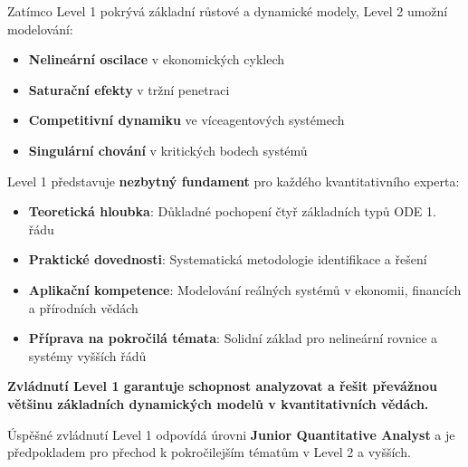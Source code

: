 \begin{transition}
\label{trans:rozsireni-aplikaci}
Zatímco Level 1 pokrývá základní růstové a dynamické modely, Level 2 umožní modelování:

\begin{itemize}
\item \textbf{Nelineární oscilace} v ekonomických cyklech
\item \textbf{Saturační efekty} v tržní penetraci
\item \textbf{Competitivní dynamiku} ve víceagentových systémech
\item \textbf{Singulární chování} v kritických bodech systémů
\end{itemize}
\end{transition}

\vspace{0.6\baselineskip}

\begin{conclusion}
\label{con:level1-kvantitativni-fundament}
Level 1 představuje \textbf{nezbytný fundament} pro každého kvantitativního experta:

\begin{itemize}
\item \textbf{Teoretická hloubka}: Důkladné pochopení čtyř základních typů ODE 1. řádu
\item \textbf{Praktické dovednosti}: Systematická metodologie identifikace a řešení
\item \textbf{Aplikační kompetence}: Modelování reálných systémů v ekonomii, financích a přírodních vědách
\item \textbf{Příprava na pokročilá témata}: Solidní základ pro nelineární rovnice a systémy vyšších řádů
\end{itemize}

\textbf{Zvládnutí Level 1 garantuje schopnost analyzovat a řešit převážnou většinu základních dynamických modelů v kvantitativních vědách.}
\end{conclusion}

\vspace{0.8\baselineskip}

\begin{remark}
\label{rem:certifikacni-uroven}
Úspěšné zvládnutí Level 1 odpovídá úrovni \textbf{Junior Quantitative Analyst} a je předpokladem pro přechod k pokročilejším tématům v Level 2 a vyšších.
\end{remark}

\vspace{0.8\baselineskip}

